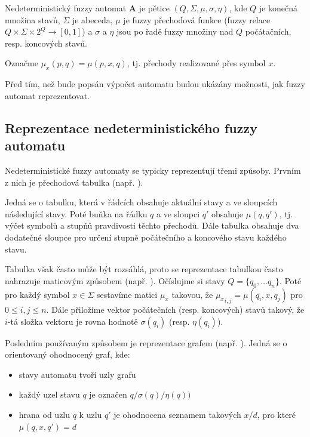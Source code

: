\begin{definition}\label{def-ZaklDefNedFuzzAut}
 Nedeterministický fuzzy automat $\mathbf{A}$ je pětice $(Q, \Sigma, \mu, \sigma, \eta)$, kde $Q$ je konečná množina stavů, $\Sigma$ je abeceda, $\mu$ je fuzzy přechodová funkce (fuzzy relace $Q \times \Sigma \times 2^Q \rightarrow [0, 1]$) a $\sigma$ a $\eta$ jsou po řadě fuzzy množiny nad $Q$ počátačních, resp. koncových stavů.
\end{definition}

\begin{notation} \label{not:muOverSym}
 Označme $\mu_x(p, q) = \mu(p, x, q)$, tj. přechody realizované přes symbol $x$.
\end{notation}

Před tím, než bude popsán výpočet automatu budou ukázány možnosti, jak fuzzy automat reprezentovat.

\subsection{Reprezentace nedeterministického fuzzy automatu}
Nedeterministické fuzzy automaty se typicky reprezentují třemi způsoby. Prvním z nich je přechodová tabulka (např. \cite{DooKre-NewDirFuzzAut}). 

Jedná se o tabulku, která v řádcích obsahuje aktuální stavy a ve sloupcích následující stavy. Poté buňka na řádku $q$ a ve sloupci $q'$ obsahuje $\mu(q, q')$, tj. výčet symbolů a stupňů pravdivosti těchto přechodů. Dále tabulka obsahuje dva dodatečné sloupce pro určení stupně počátečního a koncového stavu každého stavu.

Tabulka však často může být rozsáhlá, proto se reprezentace tabulkou často nahrazuje maticovým způsobem (např. \cite{SnaKepAbrHas-AproxStriMatchFuzzAut, StaCir-ConsFuzzAutFuzzRegExp}). Očíslujme si stavy $Q = \{ q_0, \dots q_n \}$. Poté pro každý symbol $x \in \Sigma$ sestavíme matici $\mu_x$ takovou, že ${\mu_{x}}_{i,j} = \mu(q_i, x, q_j)$ pro $0 \leq i,j \leq n$. Dále přiložíme vektor počátečních (resp. koncových) stavů takový, že $i$-tá složka vektoru je rovna hodnotě $\sigma(q_i)$ (resp. $\eta(q_i)$).

Posledním používaným způsobem je reprezentace grafem (např. \cite{DooKre-NewDirFuzzAut, GonGar-FuzzLangInfRanAccGuzzAutPumLemDetProc, StaCir-ConsFuzzAutFuzzRegExp}). Jedná se o orientovaný ohodnocený graf, kde:
\begin{itemize}
 \item stavy automatu tvoří uzly grafu
 \item každý uzel stavu $q$ je označen $q / \sigma(q) / \eta(q))$
 \item hrana od uzlu $q$ k uzlu $q'$ je ohodnocena seznamem takových $x / d$, pro které $\mu(q, x, q') = d$
\end{itemize}

